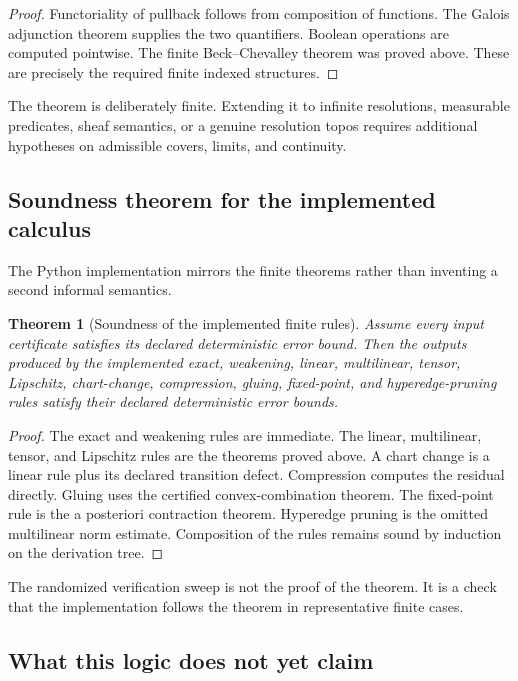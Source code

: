 \documentclass[11pt]{article}
\newtheorem{theorem}{Theorem}[section]
\theoremstyle{definition}
\theoremstyle{remark}
\begin{document}
\begin{proof}
Functoriality of pullback follows from composition of functions.  The Galois adjunction theorem supplies the two quantifiers.  Boolean operations are computed pointwise.  The finite Beck--Chevalley theorem was proved above.  These are precisely the required finite indexed structures.
\end{proof}

The theorem is deliberately finite.  Extending it to infinite resolutions, measurable predicates, sheaf semantics, or a genuine resolution topos requires additional hypotheses on admissible covers, limits, and continuity.

\subsection{Soundness theorem for the implemented calculus}

The Python implementation mirrors the finite theorems rather than inventing a second informal semantics.

\begin{theorem}[Soundness of the implemented finite rules]
Assume every input certificate satisfies its declared deterministic error bound.  Then the outputs produced by the implemented exact, weakening, linear, multilinear, tensor, Lipschitz, chart-change, compression, gluing, fixed-point, and hyperedge-pruning rules satisfy their declared deterministic error bounds.
\end{theorem}

\begin{proof}
The exact and weakening rules are immediate.  The linear, multilinear, tensor, and Lipschitz rules are the theorems proved above.  A chart change is a linear rule plus its declared transition defect.  Compression computes the residual directly.  Gluing uses the certified convex-combination theorem.  The fixed-point rule is the a posteriori contraction theorem.  Hyperedge pruning is the omitted multilinear norm estimate.  Composition of the rules remains sound by induction on the derivation tree.
\end{proof}

The randomized verification sweep is not the proof of the theorem.  It is a check that the implementation follows the theorem in representative finite cases.

\subsection{What this logic does not yet claim}
\end{document}
